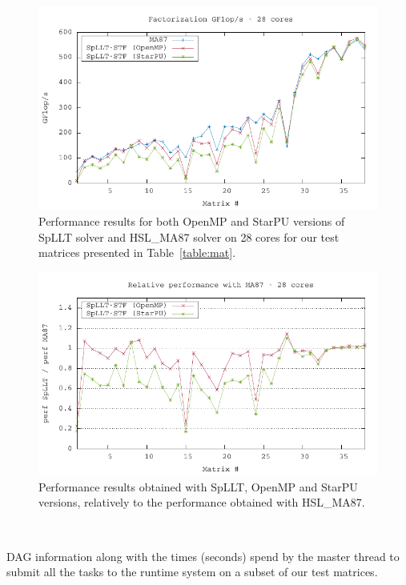 \documentclass{article}
\newcommand{\starpu}{{StarPU}\xspace}
\newcommand{\openmp}{OpenMP\xspace}
\newcommand{\ma}{HSL\_MA87\xspace}
\begin{document}

\begin{figure}[!h]
  \centering
  \includegraphics[width=\textwidth]{data/cmp_perf_stf}
  \caption{\label{fig:exp-perf} Performance results for both \openmp
    and \starpu versions of SpLLT solver and \ma solver on 28 cores
    for our test matrices presented in Table~\ref{table:mat}.}
\end{figure}

\begin{figure}[!h]
  \centering
  \includegraphics[width=\textwidth]{data/cmp_facto_rel_stf}
  \caption{\label{fig:exp-rel-perf}Performance results obtained with
    SpLLT, \openmp and \starpu versions, relatively to the performance
    obtained with \ma.}
\end{figure}

\begin{table}[htbp]
    \begin{center}
      \texttt{ }
    \end{center}
    \caption{\label{table:dag-stats}DAG information along with the
      times (seconds) spend by the master thread to submit all the
      tasks to the runtime system on a subset of our test matrices.}
\end{table}
\end{document}
